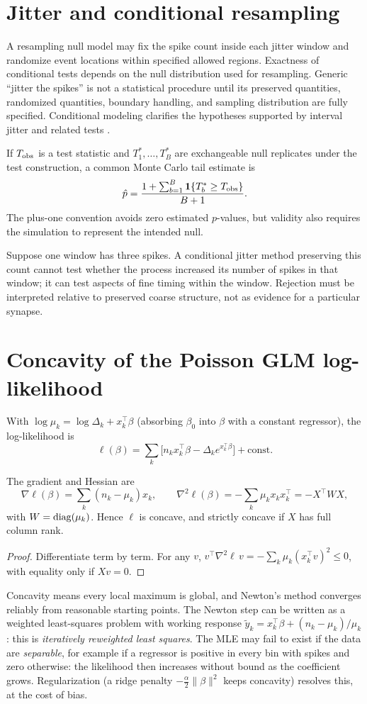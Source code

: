 \section{Jitter and conditional resampling}
A resampling null model may fix the spike count inside each jitter window and randomize event locations within specified allowed regions. Exactness of conditional tests depends on the null distribution used for resampling. Generic ``jitter the spikes'' is not a statistical procedure until its preserved quantities, randomized quantities, boundary handling, and sampling distribution are fully specified. Conditional modeling clarifies the hypotheses supported by interval jitter and related tests \cite{Amarasingham2012}.

If $T_{\rm obs}$ is a test statistic and $T_1^*,\ldots,T_B^*$ are exchangeable null replicates under the test construction, a common Monte Carlo tail estimate is
\[\hat p=\frac{1+\sum_{b=1}^B\mathbf1\{T_b^*\ge T_{\rm obs}\}}{B+1}.\]
The plus-one convention avoids zero estimated $p$-values, but validity also requires the simulation to represent the intended null.

\begin{workedexample}
Suppose one window has three spikes. A conditional jitter method preserving this count cannot test whether the process increased its number of spikes in that window; it can test aspects of fine timing within the window. Rejection must be interpreted relative to preserved coarse structure, not as evidence for a particular synapse.
\end{workedexample}
\section{Concavity of the Poisson GLM log-likelihood}
With $\log\mu_k=\log\Delta_k+x_k^\top\beta$ (absorbing $\beta_0$ into $\beta$ with a constant regressor), the log-likelihood is
\[
\ell(\beta)=\sum_k\bigl[n_kx_k^\top\beta-\Delta_ke^{x_k^\top\beta}\bigr]+\text{const}.
\]
\begin{proposition}
The gradient and Hessian are
\[
\nabla\ell(\beta)=\sum_k(n_k-\mu_k)x_k,\qquad\nabla^2\ell(\beta)=-\sum_k\mu_kx_kx_k^\top=-X^\top WX,
\]
with $W=\operatorname{diag}(\mu_k)$. Hence $\ell$ is concave, and strictly concave if $X$ has full column rank.
\end{proposition}
\begin{proof}
Differentiate term by term. For any $v$, $v^\top\nabla^2\ell\,v=-\sum_k\mu_k(x_k^\top v)^2\le0$, with equality only if $Xv=0$.
\end{proof}
Concavity means every local maximum is global, and Newton's method converges reliably from reasonable starting points. The Newton step can be written as a weighted least-squares problem with working response $\tilde y_k=x_k^\top\beta+(n_k-\mu_k)/\mu_k$: this is \emph{iteratively reweighted least squares}. The MLE may fail to exist if the data are \emph{separable}, for example if a regressor is positive in every bin with spikes and zero otherwise: the likelihood then increases without bound as the coefficient grows. Regularization (a ridge penalty $-\frac\alpha2\|\beta\|^2$ keeps concavity) resolves this, at the cost of bias.

